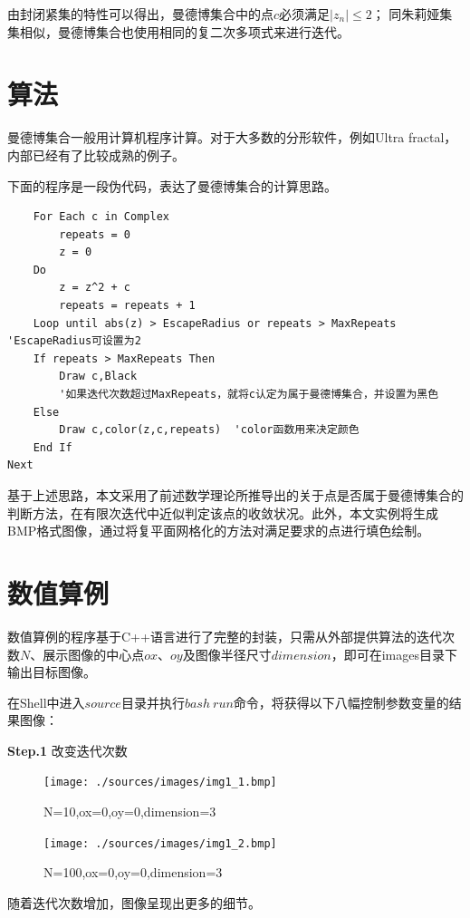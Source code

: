 \documentclass{ctexart}
\begin{document}
由封闭紧集的特性可以得出，曼德博集合中的点$c$必须满足$|z_n|\le 2$；
同朱莉娅集集相似，曼德博集合也使用相同的复二次多项式来进行迭代。

\section{算法}
曼德博集合一般用计算机程序计算。对于大多数的分形软件，例如Ultra fractal，内部已经有了比较成熟的例子。

下面的程序是一段伪代码，表达了曼德博集合的计算思路。

\begin{verbatim}
    For Each c in Complex
        repeats = 0
        z = 0
    Do
        z = z^2 + c
        repeats = repeats + 1
    Loop until abs(z) > EscapeRadius or repeats > MaxRepeats 'EscapeRadius可设置为2
    If repeats > MaxRepeats Then
        Draw c,Black
        '如果迭代次数超过MaxRepeats，就将c认定为属于曼德博集合，并设置为黑色
    Else
        Draw c,color(z,c,repeats)  'color函数用来决定颜色
    End If
Next
\end{verbatim}

基于上述思路，本文采用了前述数学理论所推导出的关于点是否属于曼德博集合的判断方法，在有限次迭代中近似判定该点的收敛状况。此外，本文实例将生成BMP格式图像，通过将复平面网格化的方法对满足要求的点进行填色绘制。

\section{数值算例}
数值算例的程序基于C++语言进行了完整的封装，只需从外部提供算法的迭代次数$N$、展示图像的中心点$ox$、$oy$及图像半径尺寸$dimension$，即可在images目录下输出目标图像。

在Shell中进入$source$目录并执行$bash\ run$命令，将获得以下八幅控制参数变量的结果图像：

\textbf{Step.1} 改变迭代次数

\begin{figure}[htb]
\centering
\begin{minipage}{0.48\linewidth}
\centering
\texttt{[image: ./sources/images/img1\_1.bmp]}
\caption{N=10,ox=0,oy=0,dimension=3}
\end{minipage}\hfill
\begin{minipage}{0.48\linewidth}
\centering
\texttt{[image: ./sources/images/img1\_2.bmp]}
\caption{N=100,ox=0,oy=0,dimension=3}
\end{minipage}
\end{figure}

随着迭代次数增加，图像呈现出更多的细节。
\end{document}
